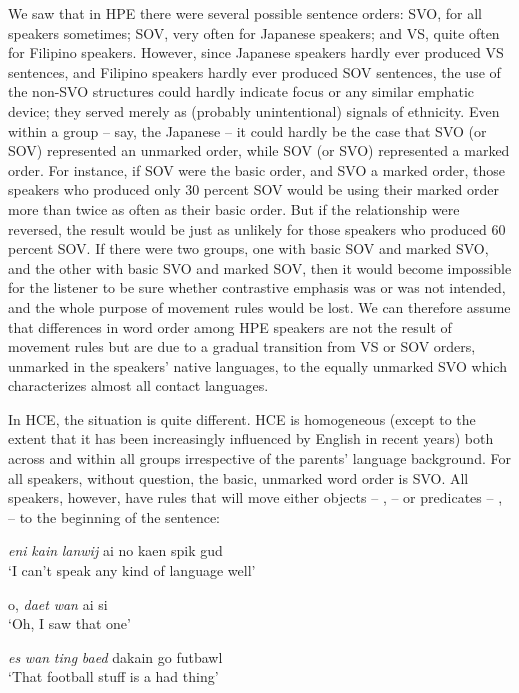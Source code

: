 We saw that in HPE there were several possible sentence orders: SVO, for all speakers sometimes; SOV, very often for Japanese speak\-ers; and VS, quite often for Filipino speakers. However, since Japanese speakers hardly ever produced VS sentences, and Filipino speakers hardly ever produced SOV sentences, the use of the non-SVO structures could hardly indicate focus or any similar emphatic device; they served merely as (probably unintentional) signals of ethnicity. Even within a group -- say, the Japanese -- it could hardly be the case that SVO (or SOV) represented an unmarked order, while SOV (or SVO) represented a marked order. For instance, if SOV were the basic order, and SVO a marked order, those speakers who produced only 30 percent SOV would be using their marked order more than twice as often as their basic order. But if the relationship were reversed, the result would be just as unlikely for those speakers who produced 60 percent SOV. If there were two groups, one with basic SOV and marked SVO, and the other with basic SVO and marked SOV, then it would become impossible for the listener to be sure whether contrastive emphasis was or was not intended, and the whole purpose of movement rules would be lost. We can therefore assume that differences in word order among HPE speakers are not the result of movement rules but are due to a gradual transition from VS or SOV orders, unmarked in the speakers' native languages, to the equally unmarked SVO which characterizes almost all contact languages.

In HCE, the situation is quite different. HCE is homogeneous (except to the extent that it has been increasingly influenced by English in recent years) both across and within all groups irrespective of the parents' language background. For all speakers, without question, the basic, unmarked word order is SVO. All speakers, however, have rules that will move either objects -- ,  -- or predicates -- ,  -- to the beginning of the sentence:



\ea\label{ex:21}
 \textit{eni} \textit{kain} \textit{lanwij} ai no kaen spik gud \\
\glt  `I can't speak any kind of language well'
\z

\ea\label{ex:22}
 o, \textit{daet} \textit{wan} ai si\\
\glt  `Oh, I saw that one'
\z

\ea\label{ex:23}
 \textit{es} \textit{wan} \textit{ting} \textit{baed} dakain go futbawl \\
\glt  `That football stuff is a had thing'
\z

